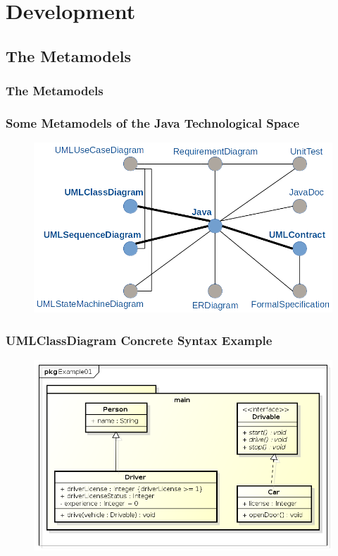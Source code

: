 \documentclass{beamer}
\begin{document}
\section{Development} %
\subsection{The Metamodels}
\begin{frame}
	\frametitle{The Metamodels}
\end{frame}

\begin{frame}
	\frametitle{Some Metamodels of the Java Technological Space}
	\begin{figure}
		\vskip -5pt
		\includegraphics[scale=0.3]{network_metamodels_java}
	\end{figure}
\end{frame}

\begin{frame}
	\frametitle{UMLClassDiagram Concrete Syntax Example}
	\nocite{omg2007unified}
	\begin{figure}[H]
		\includegraphics[width=.8\textwidth]{umlClassDiagramExample01_Diagram}
	\end{figure}
\end{frame}
\end{document}
